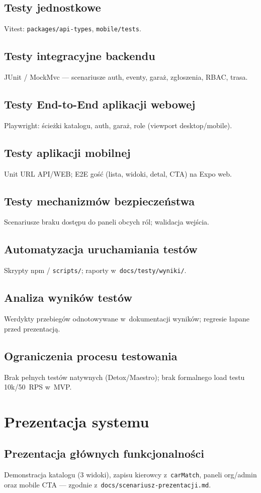\documentclass{sprz}
\begin{document}
\section{Testy jednostkowe}
Vitest: \texttt{packages/api-types}, \texttt{mobile/tests}.
\section{Testy integracyjne backendu}
JUnit / MockMvc --- scenariusze auth, eventy, garaż, zgłoszenia, RBAC, trasa.
\section{Testy End-to-End aplikacji webowej}
Playwright: ścieżki katalogu, auth, garaż, role (viewport desktop/mobile).
\section{Testy aplikacji mobilnej}
Unit URL API/WEB; E2E gość (lista, widoki, detal, CTA) na Expo web.
\section{Testy mechanizmów bezpieczeństwa}
Scenariusze braku dostępu do paneli obcych ról; walidacja wejścia.
\section{Automatyzacja uruchamiania testów}
Skrypty npm / \texttt{scripts/}; raporty w~\texttt{docs/testy/wyniki/}.
\section{Analiza wyników testów}
Werdykty przebiegów odnotowywane w~dokumentacji wyników; regresie łapane przed prezentacją.
\section{Ograniczenia procesu testowania}
Brak pełnych testów natywnych (Detox/Maestro); brak formalnego load testu 10k/50~RPS w~MVP.

\chapter{Prezentacja systemu}
\section{Prezentacja głównych funkcjonalności}
Demonstracja katalogu (3 widoki), zapisu kierowcy z~\texttt{carMatch}, paneli org/admin oraz mobile CTA --- zgodnie z~\texttt{docs/scenariusz-prezentacji.md}.
\end{document}
